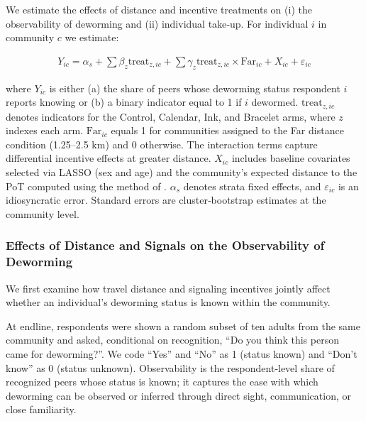 \documentclass[12pt,a4paper]{article}
\begin{document}
We estimate the effects of distance and incentive treatments on (i) the observability of deworming and (ii) individual take‑up.  For individual $i$ in community $c$ we estimate:

\begin{align*}
 Y_{ic}  = \alpha_s + \sum \beta_z \textrm{treat}_{z,ic} + 
    \sum \gamma_z \textrm{treat}_{z,ic} \times \textrm{Far}_{ic} +
    X_{ic} + \varepsilon_{ic} \label{eq:rf} 
\end{align*}

where $Y_{ic}$ is either (a) the share of peers whose deworming status respondent $i$ reports knowing or (b) a binary indicator equal to 1 if $i$ dewormed.  $\textrm{treat}_{z,ic}$ denotes indicators for the Control, Calendar, Ink, and Bracelet arms, where $z$ indexes each arm. $\textrm{Far}_{ic}$ equals 1 for communities assigned to the Far distance condition (1.25–2.5 km) and 0 otherwise. The interaction terms capture differential incentive effects at greater distance. $X_{ic}$ includes baseline covariates selected via LASSO (sex and age) and the community’s expected distance to the PoT computed using the method of \citet{borusyak2023nonrandom}.  $\alpha_s$ denotes strata fixed effects, and $\varepsilon_{ic}$ is an idiosyncratic error.  Standard errors are cluster‑bootstrap estimates at the community level.

\subsubsection{Effects of Distance and Signals on the Observability of Deworming} %

We first examine how travel distance and signaling incentives jointly affect whether an individual’s deworming status is known within the community.

At endline, respondents were shown a random subset of ten adults from the same community and asked, conditional on recognition, “Do you think this person came for deworming?”.  We code “Yes” and “No” as 1 (status known) and “Don’t know” as 0 (status unknown).  Observability is the respondent‑level share of recognized peers whose status is known; it captures the ease with which deworming can be observed or inferred through direct sight, communication, or close familiarity.
\end{document}
